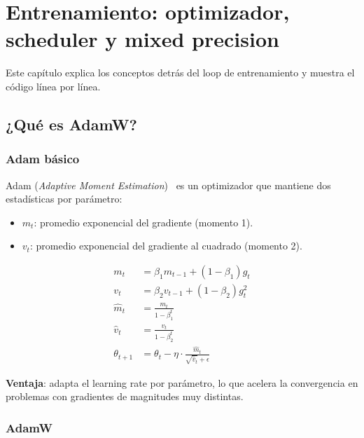 \chapter{Entrenamiento: optimizador, scheduler y mixed precision}
\label{cap:entrenamiento}

Este capítulo explica los conceptos detrás del loop de
entrenamiento y muestra el código línea por línea.

\section{¿Qué es AdamW?}

\subsection{Adam básico}

Adam (\emph{Adaptive Moment Estimation})~\cite{kingma2014adam}
es un optimizador que mantiene dos estadísticas por parámetro:

\begin{itemize}
  \item $m_t$: promedio exponencial del gradiente (momento 1).
  \item $v_t$: promedio exponencial del gradiente al cuadrado
        (momento 2).
\end{itemize}

\begin{align}
  m_t &= \beta_1 m_{t-1} + (1 - \beta_1) g_t \\
  v_t &= \beta_2 v_{t-1} + (1 - \beta_2) g_t^2 \\
  \hat{m}_t &= \frac{m_t}{1 - \beta_1^t} \\
  \hat{v}_t &= \frac{v_t}{1 - \beta_2^t} \\
  \theta_{t+1} &= \theta_t - \eta \cdot \frac{\hat{m}_t}{\sqrt{\hat{v}_t} + \epsilon}
\end{align}

\noindent\textbf{Ventaja}: adapta el learning rate por
parámetro, lo que acelera la convergencia en problemas con
gradientes de magnitudes muy distintas.

\subsection{AdamW}

